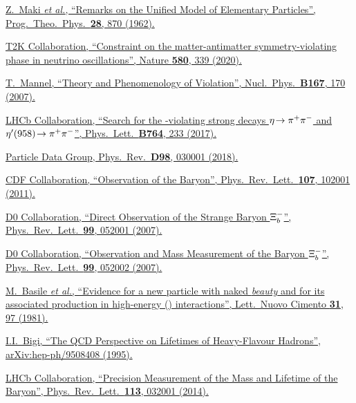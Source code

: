 {\begin{thebibliography}{xxx}
	\href{https://doi.org/10.1143/PTP.28.870}{Z.~Maki \textit{et al.}, \enquote{Remarks on the Unified Model of Elementary Particles}, Prog.\ Theo.\ Phys.\ \textbf{28}, 870 (1962).}

	\href{https://doi.org/10.1038/s41586-020-2177-0}{T2K Collaboration, \enquote{Constraint on the matter-antimatter symmetry-violating phase in neutrino oscillations}, Nature \textbf{580}, 339 (2020).}

	\href{https://doi.org/10.1016/j.nuclphysbps.2006.12.083}{T.~Mannel, \enquote{Theory and Phenomenology of \CP Violation}, Nucl.\ Phys.\ \textbf{B167}, 170 (2007).}

	\href{https://doi.org/10.1016/j.physletb.2016.11.032}{LHCb Collaboration, \enquote{Search for the \CP-violating strong decays $\eta\!\rightarrow {\ensuremath{{\pi}^+}}{\ensuremath{{\pi}^-}}$ and $\eta'(958)\!\rightarrow {\ensuremath{{\pi}^+}}{\ensuremath{{\pi}^-}}$}, Phys.\ Lett.\ \textbf{B764}, 233 (2017).}

	\href{https://link.aps.org/doi/10.1103/PhysRevD.98.030001}{Particle Data Group, Phys.\ Rev.\ \textbf{D98}, 030001 (2018).}

	\href{https://doi.org/10.1103/PhysRevLett.107.102001}{CDF Collaboration, \enquote{Observation of the \Xibz Baryon}, Phys.\ Rev.\ Lett.\ \textbf{107}, 102001 (2011).}

	\href{https://doi.org/10.1103/PhysRevLett.99.052001}{D0 Collaboration, \enquote{Direct Observation of the Strange \bquark Baryon ${{\Xi}^-_{b}}$}, Phys.\ Rev.\ Lett.\ \textbf{99}, 052001 (2007).}

	\href{https://doi.org/10.1103/PhysRevLett.99.052002}{D0 Collaboration, \enquote{Observation and Mass Measurement of the Baryon ${{\Xi}^-_{b}}$}, Phys.\ Rev.\ Lett.\ \textbf{99}, 052002 (2007).}

	\href{https://doi.org/10.1007/BF02822406}{M.~Basile \textit{et al.}, \enquote{Evidence for a new particle with naked \textit{beauty} and for its associated production in high-energy (\proton\proton) interactions}, Lett.\ Nuovo Cimento \textbf{31}, 97 (1981).}

	\href{https://arxiv.org/abs/hep-ph/9508408}{I.I.~Bigi, \enquote{The QCD Perspective on Lifetimes of Heavy-Flavour Hadrons}, arXiv:hep-ph/9508408 (1995).}

	\href{https://doi.org/10.1103/PhysRevLett.113.032001}{LHCb Collaboration, \enquote{Precision Measurement of the Mass and Lifetime of the \Xibz Baryon}, Phys.\ Rev.\ Lett.\ \textbf{113}, 032001 (2014).}


\end{thebibliography}}
